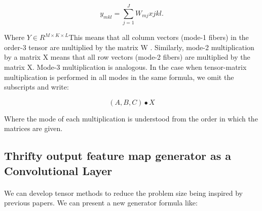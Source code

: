 \documentclass{report}
\begin{document}
\begin{equation*}
y_{mkl} = \sum^J_{j=1}W_{mj}x{jkl}.
\end{equation*} 

Where $Y \in R^{M\times K\times L}$This means that all column vectors (mode-1 fibers) in the order-3 tensor are multiplied by the matrix
W . Similarly, mode-2 multiplication by a matrix X means that all row vectors (mode-2 fibers) are
multiplied by the matrix X. Mode-3 multiplication is analogous.
In the case when tensor-matrix multiplication is performed in all modes in the same formula, we
omit the subscripts and write:


\begin{equation*}
(A,B,C)\bullet{X}
\end{equation*} 

Where the mode of each multiplication is understood from the order in which the matrices are given.






\subsection{Thrifty output feature map generator as a Convolutional Layer}

\paragraph*{}
We can develop tensor methods to reduce the problem size being inspired by previous papers\cite{danish,mobilenets}. We can present a new generator formula like:
\end{document}
